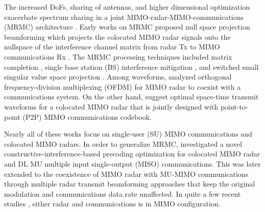 \documentclass[10pt,journal]{IEEEtran}
\theoremstyle{definition}
\begin{document}
	The increased DoFs, sharing of antennas, and higher dimensional optimization exacerbate spectrum sharing in a joint MIMO-radar-MIMO-communications (MRMC) architecture \cite{alaee2020information,dokhanchi2020multi}. %
	Early works on MRMC proposed null space projection beamforming which projects the colocated MIMO radar signals onto the nullspace of the interference channel matrix from radar Tx to MIMO communications Rx \cite{khawar2015target}. The MRMC processing techniques included matrix completion %
	\cite{MCMIMO_RadComm}, single base station (BS) interference mitigation \cite{khawar2015target}, and switched small singular value space projection %
	\cite{mahal2017spectral}. %
	Among waveforms, \cite{bao2019precoding} analyzed orthogonal frequency-division multiplexing (OFDM) for MIMO radar to coexist with a communications system. On the other hand, \cite{qian2018joint,rihan2018optimum} suggest optimal space-time transmit waveforms for a colocated MIMO radar that is jointly designed with point-to-point (P2P) MIMO communications codebook.
	
	Nearly all of these works focus on single-user (SU) MIMO communications and colocated MIMO radars. In order to generalize MRMC, \cite{liu2018mimo} investigated a novel constructive-interference-based precoding optimization for colocated MIMO radar and DL MU multiple input single-output (MISO) communications. This was later extended to the coexistence of MIMO radar with MU-MIMO communications \cite{liu2018mu} through multiple radar transmit beamforming approaches that keep the original modulation and communications data rate unaffected. In quite a few recent studies \cite{Lops2020uplink,Lops2019serveillance}, either radar and communications is in MIMO configuration. %
	
	
\end{document}
